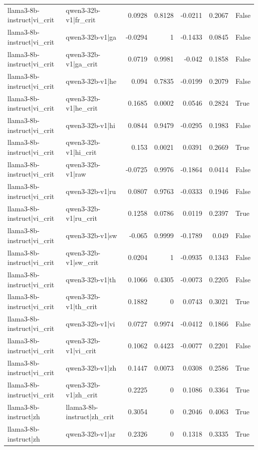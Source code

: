 \begin{table}
\begin{tabular}{l l r r r r l}
llama3-8b-instruct|vi_crit & qwen3-32b-v1|fr_crit & 0.0928 & 0.8128 & -0.0211 & 0.2067 & False \\
llama3-8b-instruct|vi_crit & qwen3-32b-v1|ga & -0.0294 & 1 & -0.1433 & 0.0845 & False \\
llama3-8b-instruct|vi_crit & qwen3-32b-v1|ga_crit & 0.0719 & 0.9981 & -0.042 & 0.1858 & False \\
llama3-8b-instruct|vi_crit & qwen3-32b-v1|he & 0.094 & 0.7835 & -0.0199 & 0.2079 & False \\
llama3-8b-instruct|vi_crit & qwen3-32b-v1|he_crit & 0.1685 & 0.0002 & 0.0546 & 0.2824 & True \\
llama3-8b-instruct|vi_crit & qwen3-32b-v1|hi & 0.0844 & 0.9479 & -0.0295 & 0.1983 & False \\
llama3-8b-instruct|vi_crit & qwen3-32b-v1|hi_crit & 0.153 & 0.0021 & 0.0391 & 0.2669 & True \\
llama3-8b-instruct|vi_crit & qwen3-32b-v1|raw & -0.0725 & 0.9976 & -0.1864 & 0.0414 & False \\
llama3-8b-instruct|vi_crit & qwen3-32b-v1|ru & 0.0807 & 0.9763 & -0.0333 & 0.1946 & False \\
llama3-8b-instruct|vi_crit & qwen3-32b-v1|ru_crit & 0.1258 & 0.0786 & 0.0119 & 0.2397 & True \\
llama3-8b-instruct|vi_crit & qwen3-32b-v1|sw & -0.065 & 0.9999 & -0.1789 & 0.049 & False \\
llama3-8b-instruct|vi_crit & qwen3-32b-v1|sw_crit & 0.0204 & 1 & -0.0935 & 0.1343 & False \\
llama3-8b-instruct|vi_crit & qwen3-32b-v1|th & 0.1066 & 0.4305 & -0.0073 & 0.2205 & False \\
llama3-8b-instruct|vi_crit & qwen3-32b-v1|th_crit & 0.1882 & 0 & 0.0743 & 0.3021 & True \\
llama3-8b-instruct|vi_crit & qwen3-32b-v1|vi & 0.0727 & 0.9974 & -0.0412 & 0.1866 & False \\
llama3-8b-instruct|vi_crit & qwen3-32b-v1|vi_crit & 0.1062 & 0.4423 & -0.0077 & 0.2201 & False \\
llama3-8b-instruct|vi_crit & qwen3-32b-v1|zh & 0.1447 & 0.0073 & 0.0308 & 0.2586 & True \\
llama3-8b-instruct|vi_crit & qwen3-32b-v1|zh_crit & 0.2225 & 0 & 0.1086 & 0.3364 & True \\
llama3-8b-instruct|zh & llama3-8b-instruct|zh_crit & 0.3054 & 0 & 0.2046 & 0.4063 & True \\
llama3-8b-instruct|zh & qwen3-32b-v1|ar & 0.2326 & 0 & 0.1318 & 0.3335 & True \\

\end{tabular}
\end{table}
